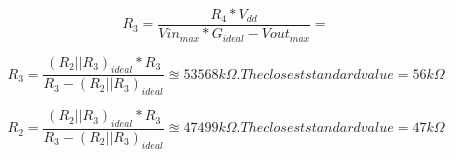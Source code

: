 \begin{equation}
	R_3 = \frac{ R_4 * V_{dd} }{ Vin_{max}*G_{ideal} - Vout_{max} } = 
\end{equation}

\begin{equation}
	R_3 = \frac{ (R_2 || R_3)_{ideal}*R_3 }{ R_3 - (R_2 || R_3)_{ideal} } \approxeq 53568 k\Omega. The closest standard value = 56 k\Omega
\end{equation}


\begin{equation}
	R_2 = \frac{ (R_2 || R_3)_{ideal}*R_3 }{ R_3 - (R_2 || R_3)_{ideal} } \approxeq 47499 k\Omega. The closest standard value = 47 k\Omega
\end{equation}

